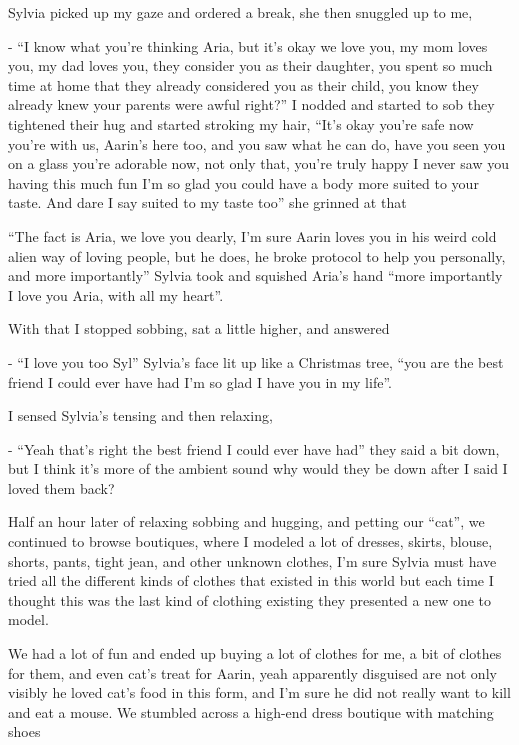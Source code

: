 \documentclass[colorlinks,12pt,a4paper]{book}
\begin{document}
 Sylvia picked up my gaze and ordered a break, she then snuggled up to me,\par
 \bigskip
 
 - “I know what you're thinking Aria, but it's okay we love you, my mom loves you, my dad loves you, they consider you as 
 their daughter, you spent so much time at home that they already considered you as their child, you know they already 
 knew your parents were awful right?” I nodded and started to sob they tightened their hug and started stroking my hair, 
 “It's okay you're safe now you're with us, Aarin's here too, and you saw what he can do, have you seen you on a glass 
 you're adorable now, not only that, you're truly happy I never saw you having this much fun I'm so glad you could have a 
 body more suited to your taste. And dare I say suited to my taste too” she grinned at that\par
 \bigskip
 
 “The fact is Aria, we love you dearly, I'm sure Aarin loves you in his weird cold alien way of loving people, but he does,
  he broke protocol to help you personally, and more importantly” Sylvia took and squished Aria's hand “more importantly 
  I love you Aria, with all my heart”.\par
  \bigskip
 
 With that I stopped sobbing, sat a little higher, and answered\par
 \bigskip
 - “I love you too Syl” Sylvia's face lit up like a Christmas tree, “you are the best friend I could ever have had I'm so 
 glad I have you in my life”.\par
 \bigskip
 I sensed Sylvia's tensing and then relaxing, \par
 \bigskip
 - “Yeah that's right the best friend I could ever have had” they said a bit down, but I think it's more of the 
 ambient sound why would they be down after I said I loved them back?\par
 \bigskip
 
 Half an hour later of relaxing sobbing and hugging, and petting our “cat”, we continued to browse boutiques, where 
 I modeled a lot of dresses, skirts, blouse, shorts, pants, tight jean, and other unknown clothes, I'm sure Sylvia must
  have tried all the different kinds of clothes that existed in this world but each time I thought this was the last 
  kind of clothing existing they presented a new one to model.\par
  \bigskip
 
 We had a lot of fun and ended up buying a lot of clothes for me, a bit of clothes for them, and even cat's treat for Aarin, 
 yeah apparently disguised are not only visibly he loved cat's food in this form, and I'm sure he did not really want to kill
  and eat a mouse. We stumbled across a high-end dress boutique with matching shoes\par
  \bigskip
 
\end{document}

